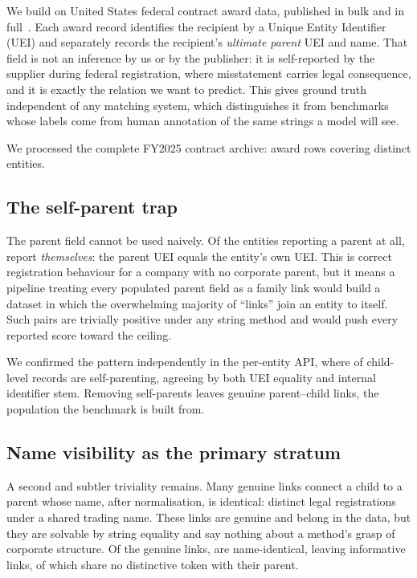 We build on United States federal contract award data, published in bulk and in
full~\citep{usaspending_api}. Each award record identifies the recipient by a Unique Entity
Identifier (UEI) and separately records the recipient's \emph{ultimate parent} UEI and
name. That field is not an inference by us or by the publisher: it is self-reported by
the supplier during federal registration, where misstatement carries legal consequence,
and it is exactly the relation we want to predict. This gives ground truth independent
of any matching system, which distinguishes it from benchmarks whose labels come from
human annotation of the same strings a model will see.

We processed the complete FY2025 contract archive: \ArchiveRows award rows covering
\ArchiveEntities distinct entities.

\subsection{The self-parent trap}
\label{sec:selfparent}

The parent field cannot be used naively. Of the entities reporting a parent at all,
\ArchiveSelfParentPct report \emph{themselves}: the parent UEI equals the entity's own
UEI. This is correct registration behaviour for a company with no corporate parent, but
it means a pipeline treating every populated parent field as a family link would build a
dataset in which the overwhelming majority of ``links'' join an entity to itself. Such
pairs are trivially positive under any string method and would push every reported score
toward the ceiling.

We confirmed the pattern independently in the per-entity API, where \AuditSelfParentPct
of child-level records are self-parenting, agreeing by both UEI equality and internal
identifier stem. Removing self-parents leaves \ArchiveGenuineLinks genuine parent--child
links, the population the benchmark is built from.

\subsection{Name visibility as the primary stratum}
\label{sec:strata}

A second and subtler triviality remains. Many genuine links connect a child to a parent
whose name, after normalisation, is identical: distinct legal registrations under a
shared trading name. These links are genuine and belong in the data, but they are
solvable by string equality and say nothing about a method's grasp of corporate
structure. Of the \ArchiveGenuineLinks genuine links, \NvIdenticalRaw are name-identical,
leaving \NvInformative informative links, of which \NvInvisiblePctInformative share no
distinctive token with their parent.

